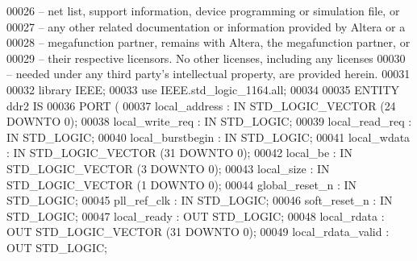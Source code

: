 \begin{DoxyCode}
{00026 \textcolor{keyword}{-- net list, support information, device programming or simulation file, or}
00027 \textcolor{keyword}{-- any other related documentation or information provided by Altera or a}
00028 \textcolor{keyword}{-- megafunction partner, remains with Altera, the megafunction partner, or}
00029 \textcolor{keyword}{-- their respective licensors.  No other licenses, including any licenses}
00030 \textcolor{keyword}{-- needed under any third party's intellectual property, are provided herein.}
00031 
00032 \textcolor{vhdlkeyword}{library }\textcolor{keywordflow}{IEEE};
00033 \textcolor{vhdlkeyword}{use }IEEE.std\_logic\_1164.\textcolor{keywordflow}{all};
00034 
00035 \textcolor{keywordflow}{ENTITY }ddr2 \textcolor{keywordflow}{IS}
00036     \textcolor{keywordflow}{PORT} \textcolor{vhdlchar}{(}
00037         local\_address   : \textcolor{keywordflow}{IN} \textcolor{comment}{STD\_LOGIC\_VECTOR} (\textcolor{vhdllogic}{24} \textcolor{keywordflow}{DOWNTO} \textcolor{vhdllogic}{0});
00038         local\_write\_req : \textcolor{keywordflow}{IN} \textcolor{comment}{STD\_LOGIC};
00039         local\_read\_req  : \textcolor{keywordflow}{IN} \textcolor{comment}{STD\_LOGIC};
00040         local\_burstbegin    : \textcolor{keywordflow}{IN} \textcolor{comment}{STD\_LOGIC};
00041         local\_wdata : \textcolor{keywordflow}{IN} \textcolor{comment}{STD\_LOGIC\_VECTOR} (\textcolor{vhdllogic}{31} \textcolor{keywordflow}{DOWNTO} \textcolor{vhdllogic}{0});
00042         local\_be    : \textcolor{keywordflow}{IN} \textcolor{comment}{STD\_LOGIC\_VECTOR} (\textcolor{vhdllogic}{3} \textcolor{keywordflow}{DOWNTO} \textcolor{vhdllogic}{0});
00043         local\_size  : \textcolor{keywordflow}{IN} \textcolor{comment}{STD\_LOGIC\_VECTOR} (\textcolor{vhdllogic}{1} \textcolor{keywordflow}{DOWNTO} \textcolor{vhdllogic}{0});
00044         \textcolor{vhdlchar}{global_reset_n}  \textcolor{vhdlchar}{:} \textcolor{keywordflow}{IN} \textcolor{comment}{STD\_LOGIC};
00045         \textcolor{vhdlchar}{pll_ref_clk} \textcolor{vhdlchar}{:} \textcolor{keywordflow}{IN} \textcolor{comment}{STD\_LOGIC};
00046         \textcolor{vhdlchar}{soft_reset_n}    \textcolor{vhdlchar}{:} \textcolor{keywordflow}{IN} \textcolor{comment}{STD\_LOGIC};
00047         local\_ready : \textcolor{keywordflow}{OUT} \textcolor{comment}{STD\_LOGIC};
00048         local\_rdata : \textcolor{keywordflow}{OUT} \textcolor{comment}{STD\_LOGIC\_VECTOR} (\textcolor{vhdllogic}{31} \textcolor{keywordflow}{DOWNTO} \textcolor{vhdllogic}{0});
00049         local\_rdata\_valid   : \textcolor{keywordflow}{OUT} \textcolor{comment}{STD\_LOGIC};
}
\end{DoxyCode}
